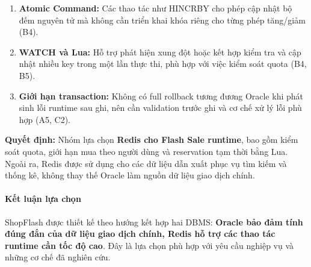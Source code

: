 \begin{enumerate}[leftmargin=*,itemsep=2pt,topsep=4pt]
\item
\textbf{Atomic Command:} Các thao tác như HINCRBY cho phép cập nhật bộ đếm nguyên tử mà không cần triển khai khóa riêng cho từng phép tăng/giảm (B4).

\item
\textbf{WATCH và Lua:} Hỗ trợ phát hiện xung đột hoặc kết hợp kiểm tra và cập nhật nhiều key trong một lần thực thi, phù hợp với việc kiểm soát quota (B4, B5).

\item
\textbf{Giới hạn transaction:} Không có full rollback tương đương Oracle khi phát sinh lỗi runtime sau ghi, nên cần validation trước ghi và cơ chế xử lý lỗi phù hợp (A5, C2).

\end{enumerate}
\textbf{Quyết định:} Nhóm lựa chọn \textbf{Redis cho Flash Sale runtime}, bao gồm kiểm soát quota, giới hạn mua theo người dùng và reservation tạm thời bằng Lua. Ngoài ra, Redis được sử dụng cho các dữ liệu dẫn xuất phục vụ tìm kiếm và thống kê, không thay thế Oracle làm nguồn dữ liệu giao dịch chính.

\paragraph*{Kết luận lựa chọn}

ShopFlash được thiết kế theo hướng kết hợp hai DBMS: \textbf{Oracle bảo đảm tính đúng đắn của dữ liệu giao dịch chính, Redis hỗ trợ các thao tác runtime cần tốc độ cao}. Đây là lựa chọn phù hợp với yêu cầu nghiệp vụ và những cơ chế đã nghiên cứu.
